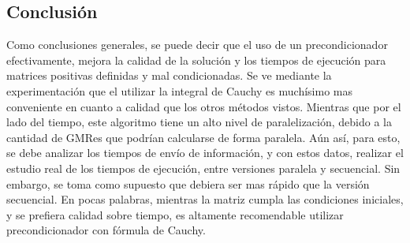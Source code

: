 \documentclass[fleqn]{article}
\begin{document}
\subsection{Conclusión}
Como conclusiones generales, se puede decir que el uso de un precondicionador efectivamente, mejora la calidad de la solución y los tiempos de ejecución para matrices positivas definidas y mal condicionadas. Se ve mediante la experimentación que el utilizar la integral de Cauchy es muchísimo mas conveniente en cuanto a calidad que los otros métodos vistos. Mientras que por el lado del tiempo, este algoritmo tiene un alto nivel de paralelización, debido a la cantidad de GMRes que podrían calcularse de forma paralela. Aún así, para esto, se debe analizar los tiempos de envío de información, y con estos datos, realizar el estudio real de los tiempos de ejecución, entre versiones paralela y secuencial. Sin embargo, se toma como supuesto que debiera ser mas rápido que la versión secuencial. En pocas palabras, mientras la matriz cumpla las condiciones iniciales, y se prefiera calidad sobre tiempo, es altamente recomendable utilizar precondicionador con fórmula de Cauchy.




\end{document}
